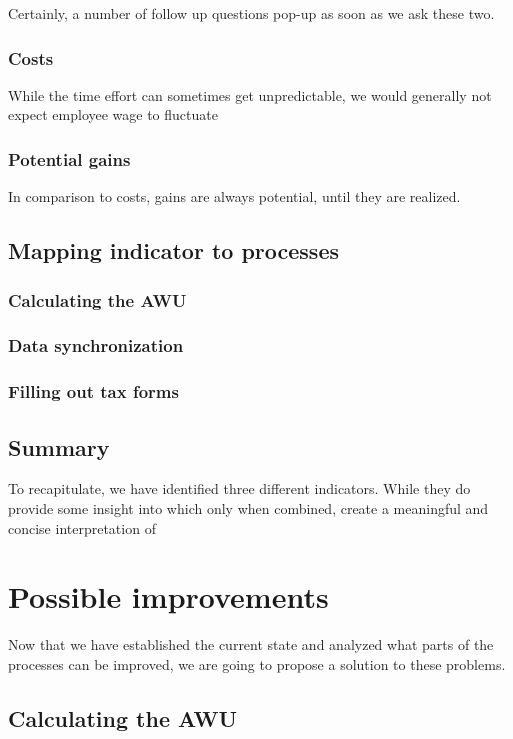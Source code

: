 \documentclass[12pt,oneside]{fithesis2}
\begin{document}
Certainly, a number of follow up questions pop-up as soon as we ask these two. 


\subsection{Costs}
While the time effort can sometimes get unpredictable, we would generally not expect employee wage to fluctuate 

\subsection{Potential gains}
In comparison to costs, gains are always potential, until they are realized. 


\section{Mapping indicator to processes}
\subsection{Calculating the AWU}

\subsection{Data synchronization}

\subsection{Filling out tax forms}
\section{Summary}
To recapitulate, we have identified three different indicators. While they do provide some insight into which only when combined, create a meaningful and concise interpretation of 

\chapter{Possible improvements}
Now that we have established the current state and analyzed what parts of the processes can be improved, we are going to propose a solution to these problems.
\section{Calculating the AWU}
\end{document}

